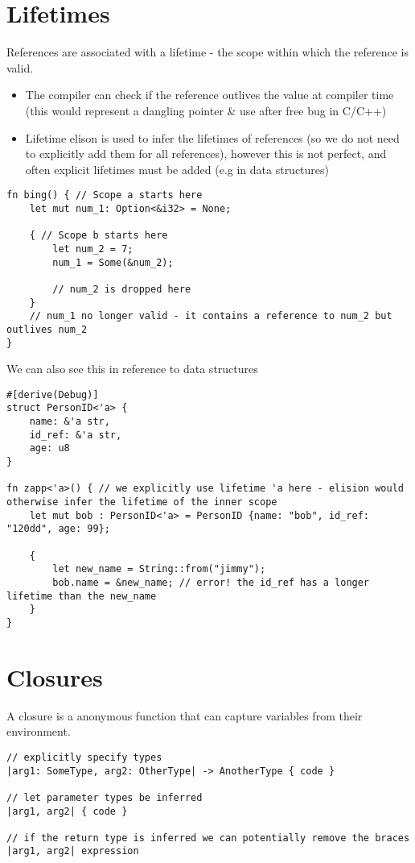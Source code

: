 \section{Lifetimes}
References are associated with a lifetime - the scope within which the reference is valid.
\begin{itemize}
	\item The compiler can check if the reference outlives the value at compiler time (this would represent a dangling pointer \& use after free bug in C/C++)
	\item Lifetime elison is used to infer the lifetimes of references (so we do not need to explicitly add them for all references), however this is not perfect, and often explicit lifetimes must be added (e.g in data structures)
\end{itemize}

\begin{verbatim}
fn bing() { // Scope a starts here
    let mut num_1: Option<&i32> = None;

    { // Scope b starts here
        let num_2 = 7;
        num_1 = Some(&num_2);

        // num_2 is dropped here
    }
    // num_1 no longer valid - it contains a reference to num_2 but outlives num_2
}
\end{verbatim}
We can also see this in reference to data structures
\begin{verbatim}
#[derive(Debug)]
struct PersonID<'a> {
    name: &'a str,
    id_ref: &'a str,
    age: u8
}

fn zapp<'a>() { // we explicitly use lifetime 'a here - elision would otherwise infer the lifetime of the inner scope
    let mut bob : PersonID<'a> = PersonID {name: "bob", id_ref: "120dd", age: 99};

    {
        let new_name = String::from("jimmy");
        bob.name = &new_name; // error! the id_ref has a longer lifetime than the new_name
    }
}
\end{verbatim}

\section{Closures}
A closure is a anonymous function that can capture variables from their environment.
\begin{verbatim}
// explicitly specify types
|arg1: SomeType, arg2: OtherType| -> AnotherType { code }

// let parameter types be inferred
|arg1, arg2| { code }

// if the return type is inferred we can potentially remove the braces
|arg1, arg2| expression
\end{verbatim}

